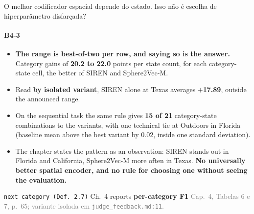 \documentclass{beamer}
\begin{document}
\begin{frame}[noframenumbering]{O melhor codificador espacial depende do estado. Isso não é escolha de hiperparâmetro disfarçada?}
    \framesubtitle{B4-3}
    \hypertarget{b43}{}
    \small\begin{itemize}\setlength{\itemsep}{0pt}\setlength{\parskip}{0pt}
        \item \textcolor{alert}{\textbf{The range is best-of-two per row, and saying so is the answer.}} Category gains of \textbf{20.2 to 22.0} points per state count, for each category-state cell, the better of SIREN and Sphere2Vec-M.
        \item Read \textbf{by isolated variant}, SIREN alone at Texas averages \textbf{$+$17.89}, outside the announced range.
        \item On the sequential task the same rule gives \textbf{15 of 21} category-state combinations to the variants, with one technical tie at Outdoors in Florida (baseline mean above the best variant by 0.02, inside one standard deviation).
        \item The chapter states the pattern as an observation: SIREN stands out in Florida and California, Sphere2Vec-M more often in Texas. \textbf{No universally better spatial encoder, and no rule for choosing one without seeing the evaluation.}
    \end{itemize}
    \vfill
    {\scriptsize\texttt{next category (Def.~2.7)} \textbullet{} Ch.~4 reports \textbf{per-category F1} \textbullet{} \textcolor{gray}{Cap.~4, Tabelas 6 e 7, p.~65; variante isolada em \texttt{judge\_feedback.md:11}.}\hfill\hyperlink{b0}{}}
\end{frame}
\end{document}
